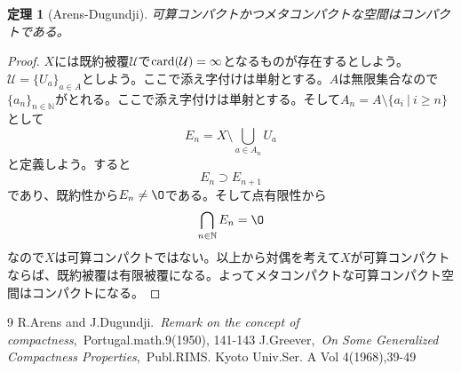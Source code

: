 \documentclass[leqno]{jsarticle}
\newtheorem{thm}{定理}
\newcommand{\nn}{\mathbb{N}}
\newcommand{\mgn}{\infty}
\newcommand{\card}{\text{{\rm card}}}
\begin{document}
\begin{thm}[Arens-Dugundji]
可算コンパクトかつメタコンパクトな空間はコンパクトである。
\end{thm}
\begin{proof}
$X$には既約被覆$\mathcal{U}$で$\card (\mathcal{U})=\mgn$となるものが存在するとしよう。$\mathcal{U}=\{U_a\}_{a\in A}$としよう。ここで添え字付けは単射とする。$A$は無限集合なので$\{a_n\}_{n\in \nn}$がとれる。ここで添え字付けは単射とする。そして$A_n=A\setminus \{a_i\ |\ i\ge n\}$として
\[
E_n=X\setminus \bigcup_{a\in A_n}U_a
\]
と定義しよう。すると
\[
E_n\supset E_{n+1}
\]
であり、既約性から$E_n\neq\O$である。そして点有限性から
\[
\bigcap_{n\in \nn}E_n=\O
\]
なので$X$は可算コンパクトではない。以上から対偶を考えて$X$が可算コンパクトならば、既約被覆は有限被覆になる。よってメタコンパクトな可算コンパクト空間はコンパクトになる。
\end{proof}


















































	
\begin{thebibliography}{9}
R.Arens and J.Dugundji.\ \textit{Remark on the concept of compactness},\ Portugal.math.9(1950), 141-143
J.Greever,\ \textit{On Some Generalized Compactness Properties},\ Publ.RIMS. Kyoto Univ.Ser. A Vol 4(1968),39-49
\end{thebibliography}




			
\end{document}
